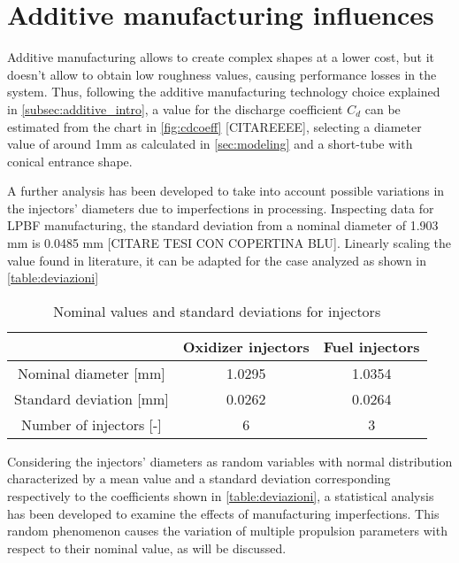 \section{Additive manufacturing influences}
\label{sec:additive}

\label{cdcoeff}


Additive manufacturing allows to create complex shapes at a lower cost, but it doesn't allow to obtain low roughness values, causing performance losses in the system. Thus, following the additive manufacturing technology choice explained in \autoref{subsec:additive_intro}, a value for the discharge coefficient $C_d$ can be estimated from the chart in \autoref{fig:cdcoeff} [CITAREEEE], selecting a diameter value of around 1mm as calculated in \autoref{sec:modeling} and a short-tube with conical entrance shape. 

A further analysis has been developed to take into account possible variations in the injectors' diameters due to imperfections in processing. Inspecting data for LPBF manufacturing, the standard deviation from a nominal diameter of 1.903 mm is 0.0485 mm [CITARE TESI CON COPERTINA BLU]. Linearly scaling the value found in literature, it can be adapted for the case analyzed as shown in \autoref{table:deviazioni}


\vspace*{5mm}
\begin{table}[H]
    \renewcommand{\arraystretch}{1.5}
    \centering
    \begin{tabular}{|c|c|c|}
        \hline
         & \textbf{Oxidizer injectors} & \textbf{Fuel injectors}\\
        \hline
        \hline
        Nominal diameter [mm] & 1.0295 & 1.0354 \\ 
        \hline
        Standard deviation [mm] & 0.0262 & 0.0264 \\
        \hline
        Number of injectors [-] & 6 & 3 \\
        \hline
    \end{tabular}
    \caption{Nominal values and standard deviations for injectors}
    \label{table:deviazioni}
\end{table}


Considering the injectors' diameters as random variables with normal distribution characterized by a mean value and a standard deviation corresponding respectively to the coefficients shown in \autoref{table:deviazioni}, a statistical analysis has been developed to examine the effects of manufacturing imperfections. This random phenomenon causes the variation of multiple propulsion parameters with respect to their nominal value, as will be discussed.

